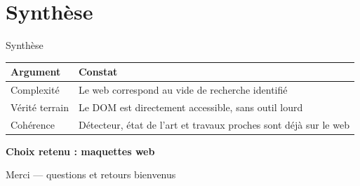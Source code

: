 \documentclass[11pt]{beamer}
\begin{document}
\section{Synthèse}

\begin{frame}{Synthèse}
  \begin{table}
    \centering
    \begin{tabular}{lp{7.5cm}}
      \toprule
      Argument & Constat \\
      \midrule
      Complexité & Le web correspond au vide de recherche identifié \\
      Vérité terrain & Le DOM est directement accessible, sans outil lourd \\
      Cohérence & Détecteur, état de l'art et travaux proches sont déjà sur le web \\
      \bottomrule
    \end{tabular}
  \end{table}

  \vspace{1.5em}
  \centering
  \Large \textbf{Choix retenu : maquettes web}
\end{frame}

\begin{frame}[standout]
  Merci --- questions et retours bienvenus
\end{frame}
\end{document}

